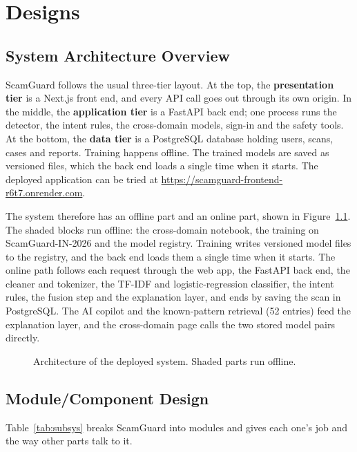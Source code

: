 \chapter{Designs}

\section{System Architecture Overview}
ScamGuard follows the usual three-tier layout. At the top, the \textbf{presentation tier} is a Next.js front end, and every API call goes out through its own origin. In the middle, the \textbf{application tier} is a FastAPI back end; one process runs the detector, the intent rules, the cross-domain models, sign-in and the safety tools. At the bottom, the \textbf{data tier} is a PostgreSQL database holding users, scans, cases and reports. Training happens offline. The trained models are saved as versioned files, which the back end loads a single time when it starts. The deployed application can be tried at \url{https://scamguard-frontend-r6t7.onrender.com}.

The system therefore has an offline part and an online part, shown in Figure~\ref{fig:arch}. The shaded blocks run offline: the cross-domain notebook, the training on ScamGuard-IN-2026 and the model registry. Training writes versioned model files to the registry, and the back end loads them a single time when it starts. The online path follows each request through the web app, the FastAPI back end, the cleaner and tokenizer, the TF-IDF and logistic-regression classifier, the intent rules, the fusion step and the explanation layer, and ends by saving the scan in PostgreSQL. The AI copilot and the known-pattern retrieval (52 entries) feed the explanation layer, and the cross-domain page calls the two stored model pairs directly.

\begin{figure}[H]
\centering
\resizebox{\linewidth}{!}{}
\caption{Architecture of the deployed system. Shaded parts run offline.}
\label{fig:arch}
\end{figure}

\section{Module/Component Design}
Table~\ref{tab:subsys} breaks ScamGuard into modules and gives each one's job and the way other parts talk to it.

